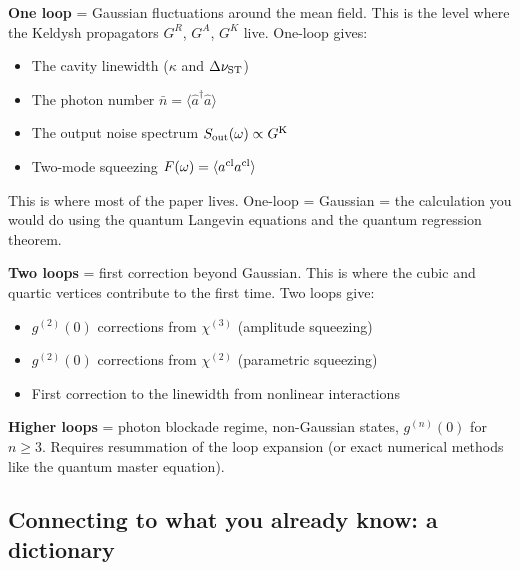 \documentclass[12pt]{article}
\newcommand{\cl}{{\rm cl}}
\newcommand{\Keldysh}{{\rm K}}
\begin{document}
\textbf{One loop} = Gaussian fluctuations around the mean field.
This is the level where the Keldysh propagators $G^R$, $G^A$, $G^K$
live.  One-loop gives:
\begin{itemize}
  \item The cavity linewidth ($\kappa$ and $\Delta\nu_{\rm ST}$)
  \item The photon number $\bar{n} = \langle\hat{a}^\dagger\hat{a}\rangle$
  \item The output noise spectrum $S_{\rm out}(\omega) \propto G^\Keldysh$
  \item Two-mode squeezing $F(\omega) = \langle a^\cl a^\cl\rangle$
\end{itemize}
This is where most of the paper lives.  One-loop = Gaussian = the
calculation you would do using the quantum Langevin equations and the
quantum regression theorem.

\textbf{Two loops} = first correction beyond Gaussian.
This is where the cubic and quartic vertices contribute to the first time.
Two loops give:
\begin{itemize}
  \item $g^{(2)}(0)$ corrections from $\chi^{(3)}$ (amplitude squeezing)
  \item $g^{(2)}(0)$ corrections from $\chi^{(2)}$ (parametric squeezing)
  \item First correction to the linewidth from nonlinear interactions
\end{itemize}

\textbf{Higher loops} = photon blockade regime, non-Gaussian states,
$g^{(n)}(0)$ for $n\geq 3$.  Requires resummation of the loop expansion
(or exact numerical methods like the quantum master equation).


\subsection{Connecting to what you already know: a dictionary}
\end{document}

